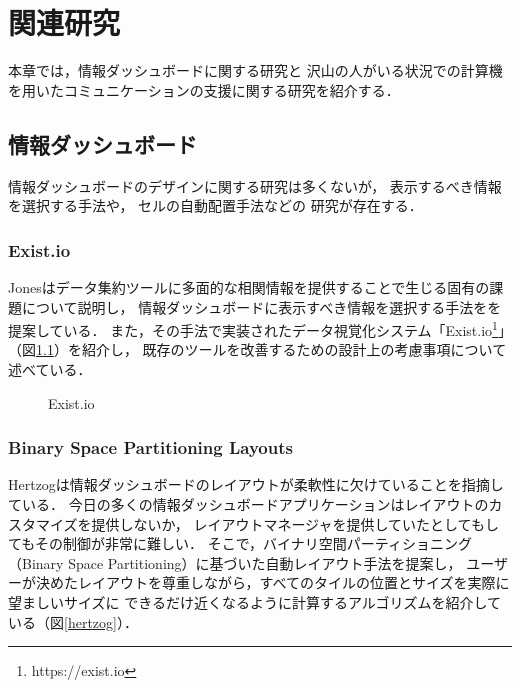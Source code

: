 \chapter{関連研究}
\label{chap:relevant}

本章では，情報ダッシュボードに関する研究と
沢山の人がいる状況での計算機を用いたコミュニケーションの支援に関する研究を紹介する．

\newpage

\section{情報ダッシュボード}
\label{chap:dashboard}

情報ダッシュボードのデザイン\cite{few}に関する研究は多くないが，
表示するべき情報を選択する手法\cite{Jones:2015:ECI:2800835.2800963}や，
セルの自動配置手法\cite{Hertzog:2015:BSP:2678025.2701383}などの
研究が存在する．

\subsection{Exist.io}
Jonesはデータ集約ツールに多面的な相関情報を提供することで生じる固有の課題について説明し，
情報ダッシュボードに表示すべき情報を選択する手法をを提案している．
また，その手法で実装されたデータ視覚化システム「Exist.io\footnote{https://exist.io}」（図\ref{existio}）を紹介し，
既存のツールを改善するための設計上の考慮事項について述べている．

\begin{figure}[H]
\centering
{}
\caption{Exist.io}
\label{existio}
\end{figure}

\subsection{Binary Space Partitioning Layouts}
Hertzogは情報ダッシュボードのレイアウトが柔軟性に欠けていることを指摘している\cite{Hertzog:2015:BSP:2678025.2701383}．
今日の多くの情報ダッシュボードアプリケーションはレイアウトのカスタマイズを提供しないか，
レイアウトマネージャを提供していたとしてもしてもその制御が非常に難しい．
そこで，バイナリ空間パーティショニング（Binary Space Partitioning）に基づいた自動レイアウト手法を提案し，
ユーザーが決めたレイアウトを尊重しながら，すべてのタイルの位置とサイズを実際に望ましいサイズに
できるだけ近くなるように計算するアルゴリズムを紹介している（図\ref{hertzog}）．


